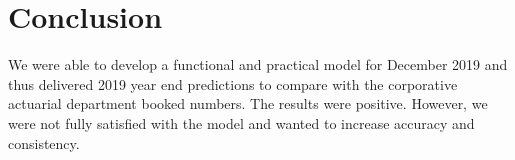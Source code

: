 \section{Conclusion}\label{Sect_Conclusion}
We were able to develop a functional and practical model for December 2019 and thus delivered 2019 year end predictions to compare with the corporative actuarial department booked numbers. The results were positive. However, we were not fully satisfied with the model and wanted to increase accuracy and consistency. 